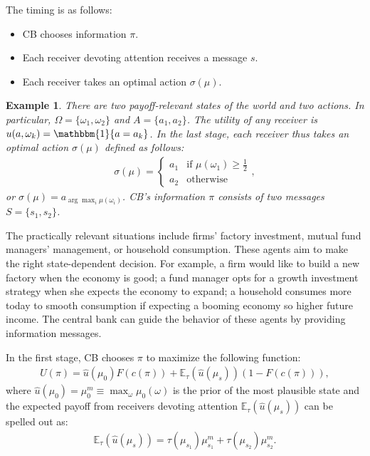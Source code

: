 \documentclass[12pt,a4paper]{article}
\newtheorem{example}{Example}
\begin{document}
The timing is as follows:
\begin{itemize}
    \item CB chooses information $\pi$.
    \item Each receiver devoting attention receives a message $s$. %
    \item Each receiver takes an optimal action $\sigma(\mu)$.
\end{itemize}

\begin{example}
    There are two payoff-relevant states of the world and two actions. In particular, $\Omega=\{\omega_1,\omega_2\}$ and $A=\{a_1,a_2\}$. The utility of any receiver is $u(a,\omega_k)=\mathbbm{1}\{a=a_{k}\}$. In the last stage, each receiver thus takes an optimal action $\sigma(\mu)$ defined as follows: 
    \begin{align}
        \sigma(\mu)=\left\{\begin{array}{ll}
        a_1   &  \mbox{if } \mu(\omega_1)\geq \frac{1}{2}\\
        a_2   &  \mbox{otherwise}
        \end{array}\right.,
    \end{align}
    or $\sigma(\mu) = a_{\arg\max_i\mu(\omega_i)}$. CB's information $\pi$ consists of two messages $S=\{s_1,s_2\}$.
\end{example}

The practically relevant situations include firms' factory investment, mutual fund managers' management, or household consumption. These agents aim to make the right state-dependent decision. For example, a firm would like to build a new factory when the economy is good; a fund manager opts for a growth investment strategy when she expects the economy to expand; a household consumes more today to smooth consumption if expecting a booming economy so higher future income. The central bank can guide the behavior of these agents by providing information messages.


In the first stage, CB chooses $\pi$ to maximize the following function:
\begin{align}
    U(\pi)=\hat{u}(\mu_0)F(c(\pi)) + \mathbb{E}_\tau(\hat{u}(\mu_s))(1-F(c(\pi))),
\end{align}
where $\hat{u}(\mu_0)=\mu_0^m\equiv\max_{\omega}\mu_0(\omega)$ is the prior of the most plausible state and the expected payoff from receivers devoting attention $\mathbb{E}_\tau(\hat{u}(\mu_s))$ can be spelled out as:
\begin{align}
    \mathbb{E}_\tau(\hat{u}(\mu_s)) = \tau(\mu_{s_1})\mu^m_{s_1} + \tau(\mu_{s_2})\mu^m_{s_2}.
\end{align}
\end{document}
